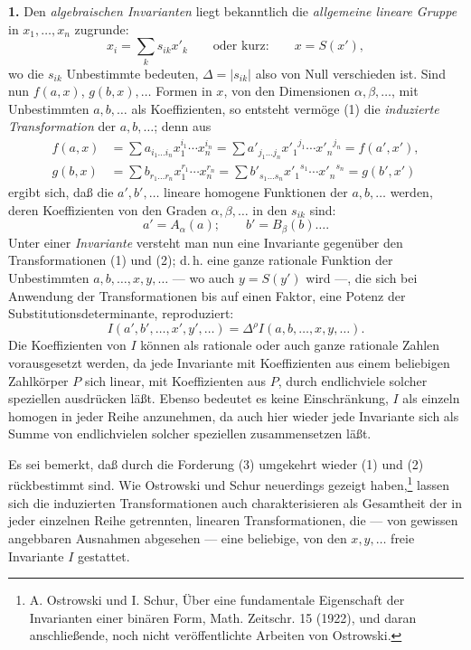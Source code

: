 \documentclass[11pt]{article}
\providecommand{\D}{\Delta}
\begin{document}
\textbf{1.} Den \emph{algebraischen Invarianten} liegt bekanntlich die \emph{allgemeine lineare Gruppe} in $x_1,\ldots,x_n$ zugrunde:
\[
\tag{1}
x_i=\sum_k s_{ik}x'_k
\qquad\text{oder kurz:}\qquad
x=S(x'),
\]
wo die $s_{ik}$ Unbestimmte bedeuten, $\D=|s_{ik}|$ also von Null verschieden ist. Sind nun $f(a,x)$, $g(b,x),\ldots$ Formen in $x$, von den Dimensionen $\alpha,\beta,\ldots$, mit Unbestimmten $a,b,\ldots$ als Koeffizienten, so entsteht vermöge (1) die \emph{induzierte Transformation} der $a,b,\ldots$; denn aus
\[
\begin{aligned}
f(a,x)&=\sum a_{i_1\ldots i_n}x_1^{i_1}\cdots x_n^{i_n}
      =\sum a'_{j_1\ldots j_n}{x'_1}^{j_1}\cdots {x'_n}^{j_n}
      =f(a',x'),\\
g(b,x)&=\sum b_{r_1\ldots r_n}x_1^{r_1}\cdots x_n^{r_n}
      =\sum b'_{s_1\ldots s_n}{x'_1}^{s_1}\cdots {x'_n}^{s_n}
      =g(b',x')
\end{aligned}
\]
ergibt sich, daß die $a',b',\ldots$ lineare homogene Funktionen der $a,b,\ldots$ werden, deren Koeffizienten von den Graden $\alpha,\beta,\ldots$ in den $s_{ik}$ sind:
\[
\tag{2}
a'=A_\alpha(a);\qquad b'=B_\beta(b)\ldots .
\]
Unter einer \emph{Invariante} versteht man nun eine Invariante gegenüber den Transformationen (1) und (2); d.\,h. eine ganze rationale Funktion der Unbestimmten $a,b,\ldots,x,y,\ldots$ --- wo auch $y=S(y')$ wird ---, die sich bei Anwendung der Transformationen bis auf einen Faktor, eine Potenz der Substitutionsdeterminante, reproduziert:
\[
\tag{3}
I(a',b',\ldots,x',y',\ldots)=\D^\rho I(a,b,\ldots,x,y,\ldots).
\]
Die Koeffizienten von $I$ können als rationale oder auch ganze rationale Zahlen vorausgesetzt werden, da jede Invariante mit Koeffizienten aus einem beliebigen Zahlkörper $P$ sich linear, mit Koeffizienten aus $P$, durch endlichviele solcher speziellen ausdrücken läßt. Ebenso bedeutet es keine Einschränkung, $I$ als einzeln homogen in jeder Reihe anzunehmen, da auch hier wieder jede Invariante sich als Summe von endlichvielen solcher speziellen zusammensetzen läßt.

Es sei bemerkt, daß durch die Forderung (3) umgekehrt wieder (1) und (2) rückbestimmt sind. Wie Ostrowski und Schur neuerdings gezeigt haben,\footnote{A. Ostrowski und I. Schur, Über eine fundamentale Eigenschaft der Invarianten einer binären Form, Math. Zeitschr. 15 (1922), und daran anschließende, noch nicht veröffentlichte Arbeiten von Ostrowski.} lassen sich die induzierten Transformationen auch charakterisieren als Gesamtheit der in jeder einzelnen Reihe getrennten, linearen Transformationen, die --- von gewissen angebbaren Ausnahmen abgesehen --- eine beliebige, von den $x,y,\ldots$ freie Invariante $I$ gestattet.
\end{document}
